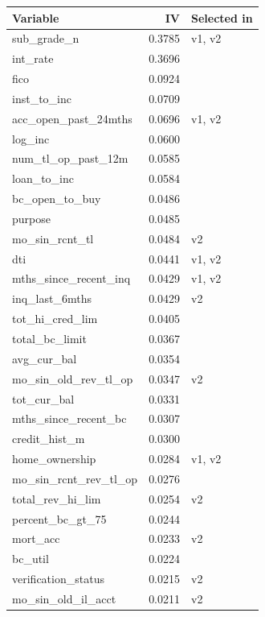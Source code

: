 \begin{tabular}{lrl}
\toprule
Variable & IV & Selected in \\
\midrule
sub\_grade\_n & 0.3785 & v1, v2 \\
int\_rate & 0.3696 &  \\
fico & 0.0924 &  \\
inst\_to\_inc & 0.0709 &  \\
acc\_open\_past\_24mths & 0.0696 & v1, v2 \\
log\_inc & 0.0600 &  \\
num\_tl\_op\_past\_12m & 0.0585 &  \\
loan\_to\_inc & 0.0584 &  \\
bc\_open\_to\_buy & 0.0486 &  \\
purpose & 0.0485 &  \\
mo\_sin\_rcnt\_tl & 0.0484 & v2 \\
dti & 0.0441 & v1, v2 \\
mths\_since\_recent\_inq & 0.0429 & v1, v2 \\
inq\_last\_6mths & 0.0429 & v2 \\
tot\_hi\_cred\_lim & 0.0405 &  \\
total\_bc\_limit & 0.0367 &  \\
avg\_cur\_bal & 0.0354 &  \\
mo\_sin\_old\_rev\_tl\_op & 0.0347 & v2 \\
tot\_cur\_bal & 0.0331 &  \\
mths\_since\_recent\_bc & 0.0307 &  \\
credit\_hist\_m & 0.0300 &  \\
home\_ownership & 0.0284 & v1, v2 \\
mo\_sin\_rcnt\_rev\_tl\_op & 0.0276 &  \\
total\_rev\_hi\_lim & 0.0254 & v2 \\
percent\_bc\_gt\_75 & 0.0244 &  \\
mort\_acc & 0.0233 & v2 \\
bc\_util & 0.0224 &  \\
verification\_status & 0.0215 & v2 \\
mo\_sin\_old\_il\_acct & 0.0211 & v2 \\
\bottomrule
\end{tabular}
